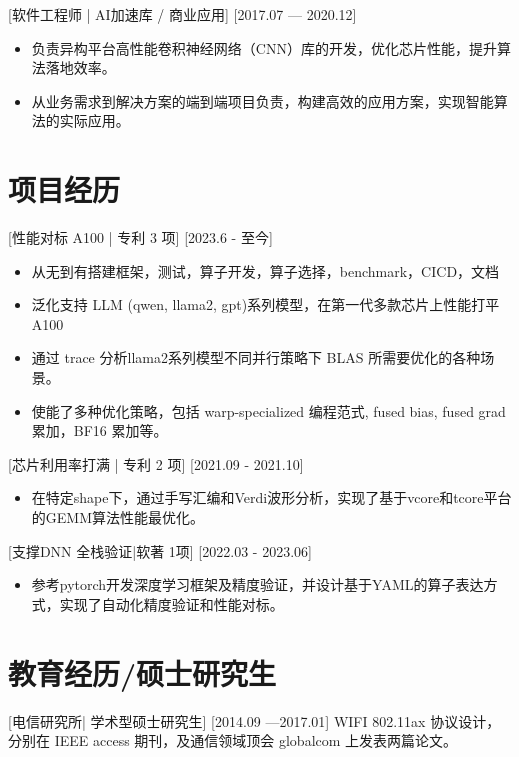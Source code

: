 \documentclass{resume}
\begin{document}
[软件工程师 | AI加速库 / 商业应用]
[2017.07 — 2020.12]
\begin{itemize}
    \item 负责异构平台高性能卷积神经网络（CNN）库的开发，优化芯片性能，提升算法落地效率。
    \item 从业务需求到解决方案的端到端项目负责，构建高效的应用方案，实现智能算法的实际应用。
\end{itemize}

\section{项目经历}

 [性能对标 A100 | 专利 3 项]
[2023.6 - 至今]
\begin{itemize}
    \item 从无到有搭建框架，测试，算子开发，算子选择，benchmark，CICD，文档
    \item 泛化支持 LLM (qwen, llama2, gpt)系列模型，在第一代多款芯片上性能打平 A100
    \item 通过 trace 分析llama2系列模型不同并行策略下 BLAS 所需要优化的各种场景。
    \item 使能了多种优化策略，包括 warp-specialized 编程范式, fused bias, fused grad 累加，BF16 累加等。
\end{itemize}

[芯片利用率打满 | 专利 2 项]
[2021.09 - 2021.10]
\begin{itemize}
    \item 在特定shape下，通过手写汇编和Verdi波形分析，实现了基于vcore和tcore平台的GEMM算法性能最优化。
\end{itemize}

[支撑DNN 全栈验证|软著 1项]
[2022.03 - 2023.06]
\begin{itemize}
    \item 参考pytorch开发深度学习框架及精度验证，并设计基于YAML的算子表达方式，实现了自动化精度验证和性能对标。
\end{itemize}

\section{教育经历/硕士研究生}
[\textnormal{电信研究所|}  学术型硕士研究生]
[2014.09 —2017.01]
WIFI 802.11ax 协议设计，分别在 IEEE access 期刊，及通信领域顶会 globalcom 上发表两篇论文。
\end{document}
